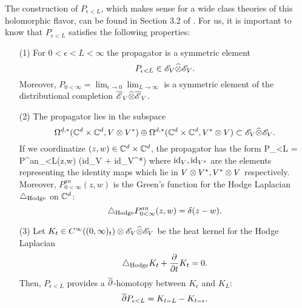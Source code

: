The construction of $P_{\epsilon<L}$, which makes sense for a wide class theories of this holomorphic flavor, can be found in Section 3.2 of \cite{BWhol}.
For us, it is important to know that $P_{\epsilon<L}$ satisfies the following properties:

\begin{enumerate}
\item[(1)] For $0 < \epsilon < L < \infty$ the propagator is a symmetric element
\[
P_{\epsilon < L} \in \mathscr E_V \widehat{\otimes} \mathscr E_V .
\]
Moreover, $P_{0 < \infty} = \lim_{\epsilon \to 0}\lim_{L \to \infty}$ is a symmetric element of the distributional completion $\overline{\mathscr E}_V \widehat{\otimes} \overline{\mathscr E}_V$. 

\item[(2)] 
The propagator lies in the subspace
\[
\Omega^{d,*}(\mathbb C^d \times \mathbb C^d, V \otimes V^*) \oplus \Omega^{d,*}(\mathbb C^d \times \mathbb C^d, V^* \otimes V) \subset \mathscr E_V \widehat{\otimes} \mathscr E_V .
\]
If we coordinatize $(z,w) \in \mathbb C^d \times \mathbb C^d$, the propagator has the form
\beqn
P_{\epsilon<L} = P^{an}_{\epsilon<L}(z,w) \tensor \left({\rm id}_{V} + {\rm id}_{V^*}\right)
\eeqn
where ${\rm id}_V, {\rm id}_{V^*}$ are the elements representing the identity maps which lie in $V \otimes V^*, V^* \otimes V$ respectively. 
Moreover, $P^{an}_{0 < \infty} (z,w)$ is the Green's function for the Hodge Laplacian $\triangle_{\rm Hodge}$ on $\mathbb C^d$:
\[
\triangle_{\rm Hodge} P^{an}_{0<\infty} (z,w) = \delta (z-w) .
\]

\item[(3)] Let $K_t \in C^\infty((0,\infty)_t) \otimes \mathscr E_V \widehat{\otimes} \mathscr E_V$ be the heat kernel for the Hodge Laplacian
\[
\triangle_{\rm Hodge} K_t + \frac{\partial}{\partial t} K_t = 0 .
\]
Then, $P_{\epsilon < L}$ provides a $\overline{\partial}$-homotopy between $K_\epsilon$ and $K_L$:
\[
\overline{\partial} P_{\epsilon < L} = K_{t=L} - K_{t=\epsilon} .
\]
\end{enumerate}


